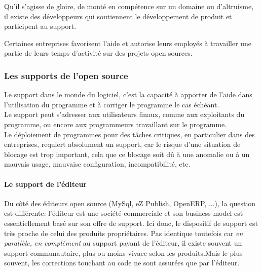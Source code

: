 			\begin{description}[font=\color{burntorange}]

				\item[les développeurs indépendants: ] Qu'il s'agisse de gloire, de monté en compétence sur un domaine ou d'altruisme, il existe des développeurs qui soutiennent le développement de produit et participent au support.
				\item[Les contributeurs et entreprises contributrices: ] Certaines entreprises favorisent l'aide et autorise leurs employés à travailler une partie de leurs temps d'activité sur des projets open sources.

			\end{description}


			\subsubsection{Les supports de l'open source\\}

				Le support dans le monde du logiciel, c'est la capacité à apporter de l'aide dans l'utilisation du programme et à corriger le programme le cas échéant.\\
				
				Le support peut s'adresser aux utilisateurs finaux, comme aux exploitants du programme, ou encore aux programmeurs travaillant sur le programme.\\
				
				Le déploiement de programmes pour des tâches critiques, en particulier dans des entreprises, requiert absolument un support, car le risque d'une situation de blocage est trop important, cela que ce blocage soit dû à une anomalie ou à un mauvais usage, mauvaise configuration, incompatibilité, etc.

				\paragraph{Le support de l'éditeur\\}

				Du côté des éditeurs open source (MySql, eZ Publish, OpenERP, ...), la question est différente: l'éditeur est une société commerciale et son business model est essentiellement basé sur son offre de support. Ici donc, le dispositif de support est très proche de celui des produits propriétaires. Pas identique toutefois car \textit{en parallèle, en complément} au support payant de l'éditeur, il existe souvent un support communautaire, plus ou moins vivace selon les produits.Mais le plus souvent, les corrections touchant au code ne sont assurées que par l'éditeur.\\

